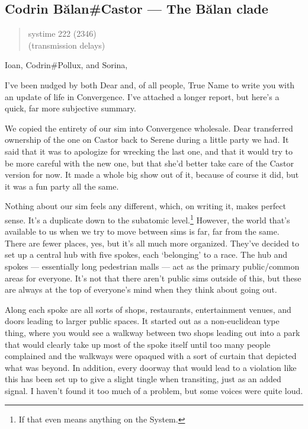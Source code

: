 \hypertarget{codrin-bux103lancastor-the-bux103lan-clade}{%
\subsection{Codrin Bălan\#Castor — The Bălan clade}\label{codrin-bux103lancastor-the-bux103lan-clade}}

\begin{quote}
systime 222 (2346)\\
(transmission delays)
\end{quote}

Ioan, Codrin\#Pollux, and Sorina,

I've been nudged by both Dear and, of all people, True Name to write you with an update of life in Convergence. I've attached a longer report, but here's a quick, far more subjective summary.

We copied the entirety of our sim into Convergence wholesale. Dear transferred ownership of the one on Castor back to Serene during a little party we had. It said that it was to apologize for wrecking the last one, and that it would try to be more careful with the new one, but that she'd better take care of the Castor version for now. It made a whole big show out of it, because of course it did, but it was a fun party all the same.

Nothing about our sim feels any different, which, on writing it, makes perfect sense. It's a duplicate down to the subatomic level.\footnote{If that even means anything on the System.} However, the world that's available to us when we try to move between sims is far, far from the same. There are fewer places, yes, but it's all much more organized. They've decided to set up a central hub with five spokes, each `belonging' to a race. The hub and spokes — essentially long pedestrian malls — act as the primary public/common areas for everyone. It's not that there aren't public sims outside of this, but these are always at the top of everyone's mind when they think about going out.

Along each spoke are all sorts of shops, restaurants, entertainment venues, and doors leading to larger public spaces. It started out as a non-euclidean type thing, where you would see a walkway between two shops leading out into a park that would clearly take up most of the spoke itself until too many people complained and the walkways were opaqued with a sort of curtain that depicted what was beyond. In addition, every doorway that would lead to a violation like this has been set up to give a slight tingle when transiting, just as an added signal. I haven't found it too much of a problem, but some voices were quite loud.

